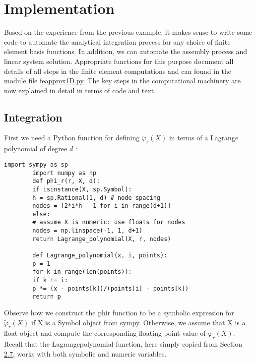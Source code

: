 \documentclass[../main.tex]{subfiles}
\begin{document}
	\chapter{Implementation}
	\label{chap:chap_4}
	\noindent Based on the experience from the previous example, it makes sense to write
	some code to automate the analytical integration process for any choice of finite
	element basis functions. In addition, we can automate the assembly process
	and linear system solution. Appropriate functions for this purpose document
	all details of all steps in the finite element computations and can found in the
	module file \href{https://github.com/hplgit/INF5620/blob/master/src/fem/fe_approx1D.py}{fe\textunderscore approx1D.py.} The key steps in the computational machinery are
	now explained in detail in terms of code and text.
	\section[Integration]{Integration}
	\label{sec:sec_4_1}
	First we need a Python function for defining $\tilde{\varphi}_{r}(X)$ in terms of a Lagrange polynomial of degree $d$ :
	\begin{lstlisting}[numbers=none]
		import sympy as sp
		import numpy as np
		def phi_r(r, X, d):
		if isinstance(X, sp.Symbol):
		h = sp.Rational(1, d) # node spacing
		nodes = [2*i*h - 1 for i in range(d+1)]
		else:
		# assume X is numeric: use floats for nodes
		nodes = np.linspace(-1, 1, d+1)
		return Lagrange_polynomial(X, r, nodes)
		
		def Lagrange_polynomial(x, i, points):
		p = 1
		for k in range(len(points)):
		if k != i:
		p *= (x - points[k])/(points[i] - points[k])
		return p	
	\end{lstlisting}
	Observe how we construct the phi\textunderscore r function to be a symbolic expression for $\tilde{\varphi}_{r}(X)$ if $\mathrm{X}$ is a Symbol object from sympy. Otherwise, we assume that $\mathrm{X}$ is a float object and compute the corresponding floating-point value of $\ddot{\varphi}_{r}(X)$. Recall that the Lagrange\textunderscore polynomial function, here simply copied from Section \hyperref[sec:sec_2_7]{2.7}, works with both symbolic and numeric variables.
	
\end{document}
